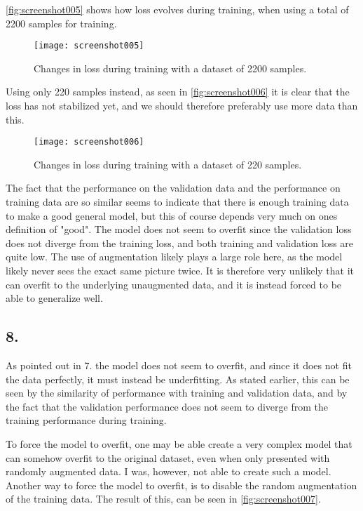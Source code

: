\documentclass[a4paper, 12pt]{article}
\begin{document}
\autoref{fig:screenshot005} shows how loss evolves during training, when using a total of 2200 samples for training. 

\begin{figure}[H]
	\centering
	\texttt{[image: screenshot005]}
	\caption{Changes in loss during training with a dataset of 2200 samples.}
	\label{fig:screenshot005}
\end{figure}

Using only 220 samples instead, as seen in \autoref{fig:screenshot006} it is clear that the loss has not stabilized yet, and we should therefore preferably use more data than this. 

\begin{figure}[H]
	\centering
	\texttt{[image: screenshot006]}
	\caption{Changes in loss during training with a dataset of 220 samples.}
	\label{fig:screenshot006}
\end{figure}

The fact that the performance on the validation data and the performance on training data are so similar seems to indicate that there is enough training data to make a good general model, but this of course depends very much on ones definition of "good". The model does not seem to overfit since the validation loss does not diverge from the training loss, and both training and validation loss are quite low. The use of augmentation likely plays a large role here, as the model likely never sees the exact same picture twice. It is therefore very unlikely that it can overfit to the underlying unaugmented data, and it is instead forced to be able to generalize well.

\subsection{8.}

As pointed out in 7. the model does not seem to overfit, and since it does not fit the data perfectly, it must instead be underfitting. As stated earlier, this can be seen by the similarity of performance with training and validation data, and by the fact that the validation performance does not seem to diverge from the training performance during training.

To force the model to overfit, one may be able create a very complex model that can somehow overfit to the original dataset, even when only presented with randomly augmented data. I was, however, not able to create such a model. Another way to force the model to overfit, is to disable the random augmentation of the training data. The result of this, can be seen in \autoref{fig:screenshot007}.
\end{document}
